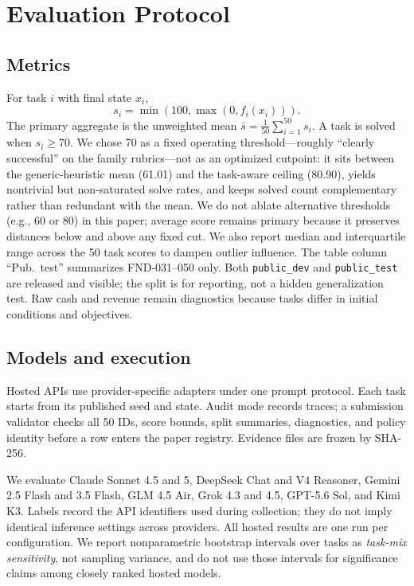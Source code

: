 \documentclass[sigconf,review]{acmart}
\begin{document}
\section{Evaluation Protocol}
\subsection{Metrics}
For task $i$ with final state $x_i$,
\begin{equation}
s_i = \min(100,\max(0,f_i(x_i))).
\end{equation}
The primary aggregate is the unweighted mean $\bar{s}=\frac{1}{50}\sum_{i=1}^{50}s_i$.
A task is solved when $s_i\geq 70$.
We chose 70 as a fixed operating threshold---roughly ``clearly successful'' on the family rubrics---not as an optimized cutpoint: it sits between the generic-heuristic mean (61.01) and the task-aware ceiling (80.90), yields nontrivial but non-saturated solve rates, and keeps solved count complementary rather than redundant with the mean.
We do not ablate alternative thresholds (e.g., 60 or 80) in this paper; average score remains primary because it preserves distances below and above any fixed cut.
We also report median and interquartile range across the 50 task scores to dampen outlier influence.
The table column ``Pub.\ test'' summarizes FND-031--050 only.
Both \texttt{public\_dev} and \texttt{public\_test} are released and visible; the split is for reporting, not a hidden generalization test.
Raw cash and revenue remain diagnostics because tasks differ in initial conditions and objectives.

\subsection{Models and execution}
Hosted APIs use provider-specific adapters under one prompt protocol.
Each task starts from its published seed and state.
Audit mode records traces; a submission validator checks all 50 IDs, score bounds, split summaries, diagnostics, and policy identity before a row enters the paper registry.
Evidence files are frozen by SHA-256.

We evaluate Claude Sonnet 4.5 and 5, DeepSeek Chat and V4 Reasoner, Gemini 2.5 Flash and 3.5 Flash, GLM 4.5 Air, Grok 4.3 and 4.5, GPT-5.6 Sol, and Kimi K3.
Labels record the API identifiers used during collection; they do not imply identical inference settings across providers.
All hosted results are one run per configuration.
We report nonparametric bootstrap intervals over tasks as \emph{task-mix sensitivity}, not sampling variance, and do not use those intervals for significance claims among closely ranked hosted models.
\end{document}
